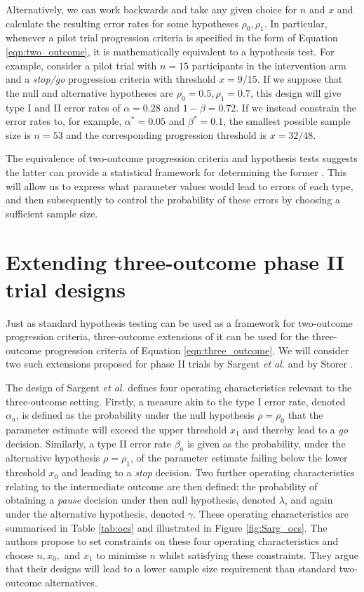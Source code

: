 \documentclass{bmcart}
\begin{document}
Alternatively, we can work backwards and take any given choice for $n$ and $x$ and calculate the resulting error rates for some hypotheses $\rho_0, \rho_1$. In particular, whenever a pilot trial progression criteria is specified in the form of Equation \ref{eqn:two_outcome}, it is mathematically equivalent to a hypothesis test. For example, consider a pilot trial with $n = 15$ participants in the intervention arm and a \emph{stop/go} progression criteria with threshold $x = 9/15$. If we suppose that the null and alternative hypotheses are $\rho_0 = 0.5, \rho_1 = 0.7$, this design will give type I and II error rates of $\alpha = 0.28$ and $1 - \beta = 0.72$. If we instead constrain the error rates to, for example, $\alpha^* = 0.05$ and $\beta^* = 0.1$, the smallest possible sample size is $n = 53$ and the corresponding progression threshold is $x = 32/48$. 

The equivalence of two-outcome progression criteria and hypothesis tests suggests the latter can provide a statistical framework for determining the former \cite{Lewis2021a}. This will allow us to express what parameter values would lead to errors of each type, and then subsequently to control the probability of these errors by choosing a sufficient sample size.

\section{Extending three-outcome phase II trial designs}\label{sec:review}

Just as standard hypothesis testing can be used as a framework for two-outcome progression criteria, three-outcome extensions of it can be used for the three-outcome progression criteria of Equation \ref{eqn:three_outcome}. We will consider two such extensions proposed for phase II trials by Sargent \emph{et al.} \cite{Sargent2001} and by Storer \cite{Storer1992}.

The design of Sargent \emph{et al.} defines four operating characteristics relevant to the three-outcome setting. Firstly, a measure akin to the type I error rate, denoted $\alpha_a$, is defined as the probability under the null hypothesis $\rho = \rho_0$ that the parameter estimate will exceed the upper threshold $x_1$ and thereby lead to a \emph{go} decision. Similarly, a type II error rate $\beta_a$ is given as the probability, under the alternative hypothesis $\rho = \rho_1$, of the parameter estimate failing below the lower threshold $x_0$ and leading to a \emph{stop} decision. Two further operating characteristics relating to the intermediate outcome are then defined: the probability of obtaining a \emph{pause} decision under then null hypothesis, denoted $\lambda$, and again under the alternative hypothesis, denoted $\gamma$. These operating characteristics are summarised in Table \ref{tab:ocs} and illustrated in Figure \ref{fig:Sarg_ocs}. The authors propose to set constraints on these four operating characteristics and choose $n, x_0,$ and $x_1$ to minimise $n$ whilst satisfying these constraints. They argue that their designs will lead to a lower sample size requirement than standard two-outcome alternatives.
\end{document}
